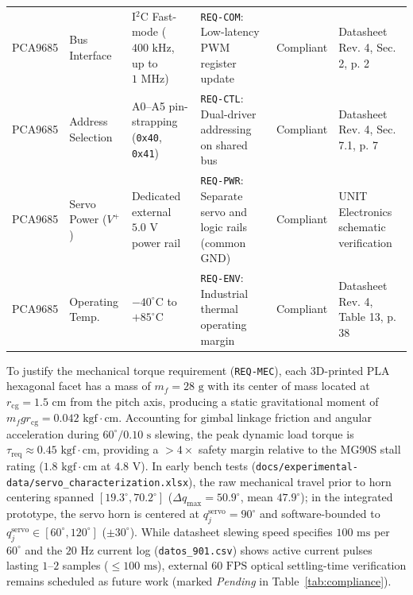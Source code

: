 \documentclass[lettersize,journal]{IEEEtran}
\begin{document}
\begin{table}[!t]
\begin{tabular}{p{1.9cm} p{2.6cm} p{3.1cm} p{3.7cm} c p{3.5cm}}
			PCA9685 & Bus Interface & I$^2$C Fast-mode ($400\text{ kHz}$, up to $1\text{ MHz}$) & \texttt{REQ-COM}: Low-latency PWM register update & Compliant & Datasheet Rev. 4, Sec. 2, p. 2 \\
			PCA9685 & Address Selection & A0--A5 pin-strapping (\texttt{0x40}, \texttt{0x41}) & \texttt{REQ-CTL}: Dual-driver addressing on shared bus & Compliant & Datasheet Rev. 4, Sec. 7.1, p. 7 \\
			PCA9685 & Servo Power ($V^+$) & Dedicated external $5.0\text{ V}$ power rail & \texttt{REQ-PWR}: Separate servo and logic rails (common GND) & Compliant & UNIT Electronics schematic verification \\
			PCA9685 & Operating Temp. & $-40^\circ\text{C}$ to $+85^\circ\text{C}$ & \texttt{REQ-ENV}: Industrial thermal operating margin & Compliant & Datasheet Rev. 4, Table 13, p. 38 \\
			\bottomrule
		\end{tabular}
	\end{table}
	
	To justify the mechanical torque requirement (\texttt{REQ-MEC}), each 3D-printed PLA hexagonal facet has a mass of $m_f = 28\text{ g}$ with its center of mass located at $r_{\text{cg}} = 1.5\text{ cm}$ from the pitch axis, producing a static gravitational moment of $m_f g r_{\text{cg}} = 0.042\text{ kgf}\cdot\text{cm}$. Accounting for gimbal linkage friction and angular acceleration during $60^\circ / 0.10\text{ s}$ slewing, the peak dynamic load torque is $\tau_{\text{req}} \approx 0.45\text{ kgf}\cdot\text{cm}$, providing a $>4\times$ safety margin relative to the MG90S stall rating ($1.8\text{ kgf}\cdot\text{cm}$ at $4.8\text{ V}$). In early bench tests (\texttt{docs/experimental-data/servo\_characterization.xlsx}), the raw mechanical travel prior to horn centering spanned $[19.3^\circ, 70.2^\circ]$ ($\Delta q_{\max} = 50.9^\circ$, mean $47.9^\circ$); in the integrated prototype, the servo horn is centered at $q_j^{\text{servo}} = 90^\circ$ and software-bounded to $q_j^{\text{servo}} \in [60^\circ, 120^\circ]$ ($\pm 30^\circ$). While datasheet slewing speed specifies $100\text{ ms}$ per $60^\circ$ and the $20\text{ Hz}$ current log (\texttt{datos\_901.csv}) shows active current pulses lasting $1\text{--}2$ samples ($\le 100\text{ ms}$), external $60\text{ FPS}$ optical settling-time verification remains scheduled as future work (marked \textit{Pending} in Table~\ref{tab:compliance}).
	
\end{document}
